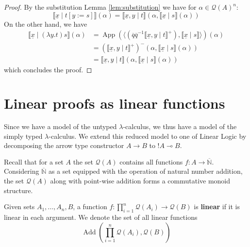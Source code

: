 \documentclass[runningheads]{llncs}
\newcommand{\bb}[1]{\mathbb{#1}}
\newcommand{\barN}{\overline{\bb{N}}}
\newcommand{\call}[1]{\mathcal{#1}}
\newcommand{\Qcal}{\call{Q}}
\newcommand{\lto}{\longrightarrow}
\begin{document}
	\begin{proof}
		By the substitution Lemma \ref{lem:substitution} we have for $\alpha \in \Qcal(A)^n$:
		\begin{equation}
			\llbracket \underline{x} \mid t[y:=s]\rrbracket(\alpha) = \llbracket \underline{x}, y \mid t\rrbracket(\alpha, \llbracket \underline{x} \mid s \rrbracket(\alpha))
			\end{equation}
		On the other hand, we have
		\begin{align*}
			\llbracket \underline{x} \mid (\lambda y.t)s\rrbracket(\alpha) &= \operatorname{App}(\big\langle (\overline{q} \overline{q}^{-1}\llbracket \underline{x}, y \mid t \rrbracket^+), \llbracket \underline{x} \mid s \rrbracket\big\rangle)(\alpha)\\
			&=(\llbracket \underline{x}, y \mid t\rrbracket^+)^-(\alpha, \llbracket\underline{x} \mid s \rrbracket(\alpha))\\
			&= \llbracket \underline{x}, y \mid t \rrbracket (\alpha, \llbracket \underline{x} \mid s \rrbracket(\alpha))
			\end{align*}
		which concludes the proof.
		\end{proof}

\section{Linear proofs as linear functions}
	Since we have a model of the untyped $\lambda$-calculus, we thus have a model of the simply typed $\lambda$-calculus. We extend this reduced model to one of Linear Logic by decomposing the arrow type constructor $A \rightarrow B$ to $!A \multimap B$.
	
	Recall that for a set $A$ the set $\Qcal(A)$ contains all functions $f: A \lto \barN$. Considering $\barN$ as a set equipped with the operation of natural number addition, the set $\Qcal(A)$ along with point-wise addition forms a commutative monoid structure.
	
	\begin{definition}
		Given sets $A_1, \ldots, A_n, B$, a function $f: \prod_{i = 1}^n \call{Q}(A_i)\lto \Qcal(B)$ is \textbf{linear} if it is linear in each argument. We denote the set of all linear functions
		\begin{equation}
			\operatorname{Add}(\prod_{i = 1}^n \call{Q}(A_i), \Qcal(B))
			\end{equation}
		\end{definition}
	
\end{document}
